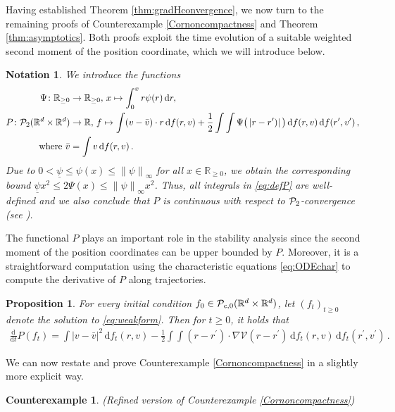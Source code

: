 \documentclass[11pt]{article}
\newtheorem{proposition}[theorem]{Proposition}
\newtheorem*{counterexample*}{Counterexample}
\newtheorem{notation}[theorem]{Notation}
\newcommand{\R}[0]{\mathbb R}
\newcommand{\dx}[1]{\frac{\mathrm{d}}{\mathrm{d}#1}}
\newcommand{\norm}[1]{\left\| #1 \right\|}
\newcommand{\abs}[1]{\left| #1 \right|}
\newcommand{\Ppo}[1]{
    \ifx #1\infty
        \mathcal{P}_{c,0}
    \else 
        \mathcal{P}_{#1,0}
    \fi 
}
\newcommand{\Pp}[1]{
    \ifx #1\infty
        \mathcal{P}_{c}
    \else 
        \mathcal{P}_{#1}
    \fi 
}
\newcommand{\msolt}[2]{f_{#1}(#2)}
\newcommand{\cappsi}{\Psi}
\newcommand{\Pfunc}{P}
\begin{document}
\begin{bibunit}[unsrtnat]
    Having established Theorem \ref{thm:gradHconvergence}, we now turn to the remaining proofs of Counterexample \ref{Cornoncompactness} and Theorem \ref{thm:asymptotics}. Both proofs exploit the time evolution of a suitable weighted second moment of the position coordinate, which we will introduce below.
	\begin{notation}
		We introduce the functions 
		\begin{align}
			\cappsi \colon \R_{\geq 0} &\to \R_{\geq 0}, \, x \mapsto \int_0^x r \psi(r) \, \mathrm{d}r, \\
			 \Pfunc \colon \Pp{2}(\R^d \times \R^d) &\to \R, \,
            f \mapsto \int (v-\bar{v}) \cdot r \, \mathrm{d} f(r,v) + \frac{1}{2} \int \int \cappsi \big( \abs{r-r^\prime)} \big) \, \mathrm{d}f(r,v) \, \mathrm{d}f(r^\prime, v^\prime) \, , \label{eq:defP} \\ 
            \text{ where } \bar{v} &= \int v \, \mathrm{d}f(r,v) \, . \nonumber
		\end{align} 
        Due to $0< \underline{\psi} \leq \psi(x) \leq \norm{\psi}_\infty$ for all $ x \in \R_{\geq 0}$, we obtain the corresponding bound $\underline{\psi} x^{2} \leq 2\Psi(x) \leq \norm{\psi}_\infty x^2$. Thus, all integrals in \eqref{eq:defP} are well-defined and we also conclude that $\Pfunc$ is continuous with respect to $\Pp{2}$-convergence (see \cite[Theorem $6.9$]{Villani}).  
	\end{notation}
    The functional $\Pfunc$ plays an important role in the stability analysis since the second moment of the position coordinates can be upper bounded by $\Pfunc$. Moreover, it is a straightforward computation using the characteristic equations \eqref{eq:ODEchar} to compute the derivative of $\Pfunc$ along trajectories.
	\begin{proposition}\label{prop:derivPfunctional}
		For every initial condition $f_0 \in \Ppo{\infty}(\R^d \times \R^d)$, let $(f_t)_{t \geq 0}$ denote the solution to \eqref{eq:weakform}. Then for $t \geq 0$, it holds that
		\begin{align}
			\dx{t} \Pfunc (f_t) = \int \abs{ v - \bar{v}  }^{2} \, \mathrm{d} \msolt{t}{r,v} - \frac{1}{2} \int \int (r-r^\prime) \cdot \nabla \mathcal{V}(r-r^\prime) \, \mathrm{d} \msolt{t}{r,v} \, \mathrm{d}\msolt{t}{r^\prime, v^\prime} \, . \label{eq:Pderiv}
		\end{align} 
	\end{proposition}
    We can now restate and prove Counterexample \ref{Cornoncompactness} in a slightly more explicit way. 
\begin{counterexample*}(Refined version of Counterexample \ref{Cornoncompactness}) \\

\end{counterexample*}
\end{bibunit}
\end{document}
